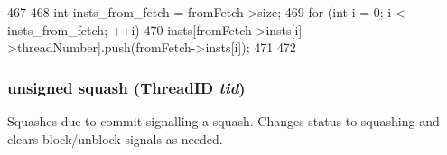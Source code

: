 \begin{DoxyCode}
467 {
468     int insts_from_fetch = fromFetch->size;
469     for (int i = 0; i < insts_from_fetch; ++i) {
470         insts[fromFetch->insts[i]->threadNumber].push(fromFetch->insts[i]);
471     }
472 }
\end{DoxyCode}
\hypertarget{classDefaultDecode_a44313b71f53a0366212ed600d2d0b11d}{
\subsubsection[{squash}]{\setlength{\rightskip}{0pt plus 5cm}unsigned squash ({\bf ThreadID} {\em tid})}}
\label{classDefaultDecode_a44313b71f53a0366212ed600d2d0b11d}
Squashes due to commit signalling a squash. Changes status to squashing and clears block/unblock signals as needed. 


